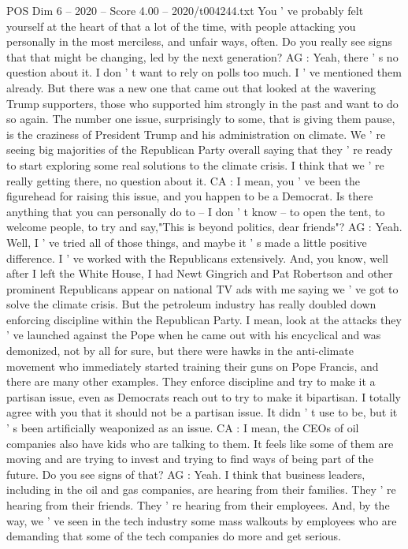 \begin{textsample}{POS Dim 6 – 2020 – Score 4.00 – 2020/t004244.txt}
You ' ve probably felt yourself at the heart of that a lot of the time, with people attacking you personally in the most merciless, and unfair ways, often.
Do you really see signs that that might be changing, led by the next generation?
AG : Yeah, there ' s no question about it.
I don ' t want to rely on polls too much.
I ' ve mentioned them already.
But there was a new one that came out that looked at the wavering Trump supporters, those who supported him strongly in the past and want to do so again.
The number one issue, surprisingly to some, that is giving them pause, is the craziness of President Trump and his administration on climate.
We ' re seeing big majorities of the Republican Party overall saying that they ' re ready to start exploring some real solutions to the climate crisis.
I think that we ' re really getting there, no question about it.
CA : I mean, you ' ve been the figurehead for raising this issue, and you happen to be a Democrat.
Is there anything that you can personally do to -- I don ' t know -- to open the tent, to welcome people, to try and say,"This is beyond politics, dear friends"?
AG : Yeah.
Well, I ' ve tried all of those things, and maybe it ' s made a little positive difference.
I ' ve worked with the Republicans extensively.
And, you know, well after I left the White House, I had Newt Gingrich and Pat Robertson and other prominent Republicans appear on national TV ads with me saying we ' ve got to solve the climate crisis.
But the petroleum industry has really doubled down enforcing discipline within the Republican Party.
I mean, look at the attacks they ' ve launched against the Pope when he came out with his encyclical and was demonized, not by all for sure, but there were hawks in the anti-climate movement who immediately started training their guns on Pope Francis, and there are many other examples.
They enforce discipline and try to make it a partisan issue, even as Democrats reach out to try to make it bipartisan.
I totally agree with you that it should not be a partisan issue.
It didn ' t use to be, but it ' s been artificially weaponized as an issue.
CA : I mean, the CEOs of oil companies also have kids who are talking to them.
It feels like some of them are moving and are trying to invest and trying to find ways of being part of the future.
Do you see signs of that?
AG : Yeah.
I think that business leaders, including in the oil and gas companies, are hearing from their families.
They ' re hearing from their friends.
They ' re hearing from their employees.
And, by the way, we ' ve seen in the tech industry some mass walkouts by employees who are demanding that some of the tech companies do more and get serious.

\end{textsample}
